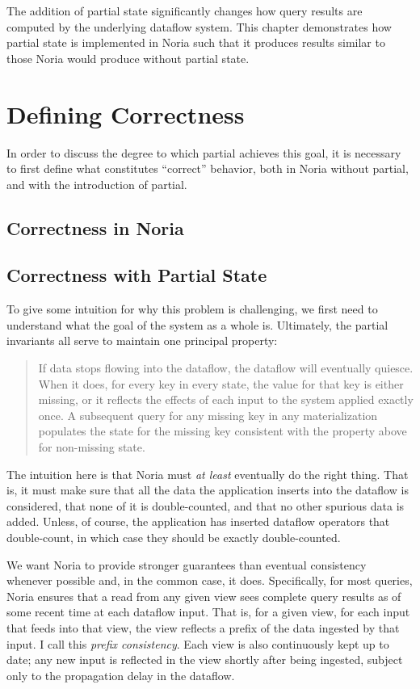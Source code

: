 The addition of partial state significantly changes how query results are
computed by the underlying dataflow system. This chapter demonstrates how
partial state is implemented in Noria such that it produces results similar to
those Noria would produce without partial state.

\section{Defining Correctness}

In order to discuss the degree to which partial achieves this goal, it is
necessary to first define what constitutes ``correct'' behavior, both in Noria
without partial, and with the introduction of partial.

\resume

\subsection{Correctness in Noria}

\subsection{Correctness with Partial State}

To give some intuition for why this problem is challenging, we first need to
understand what the goal of the system as a whole is. Ultimately, the partial
invariants all serve to maintain one principal property:

\begin{quote}
	If data stops flowing into the dataflow, the dataflow will eventually
	quiesce. When it does, for every key in every state, the value for that
	key is either missing, or it reflects the effects of each input to the
	system applied exactly once. A subsequent query for any missing key in
	any materialization populates the state for the missing key consistent
	with the property above for non-missing state.
\end{quote}

The intuition here is that Noria must \emph{at least} eventually do the right
thing. That is, it must make sure that all the data the application inserts into
the dataflow is considered, that none of it is double-counted, and that no other
spurious data is added. Unless, of course, the application has inserted dataflow
operators that double-count, in which case they should be exactly
double-counted.

We want Noria to provide stronger guarantees than eventual consistency whenever
possible and, in the common case, it does. Specifically, for most queries, Noria
ensures that a read from any given view sees complete query results as of some
recent time at each dataflow input. That is, for a given view, for each input
that feeds into that view, the view reflects a prefix of the data ingested by
that input. I call this \emph{prefix consistency}. Each view is also
continuously kept up to date; any new input is reflected in the view shortly
after being ingested, subject only to the propagation delay in the dataflow.

